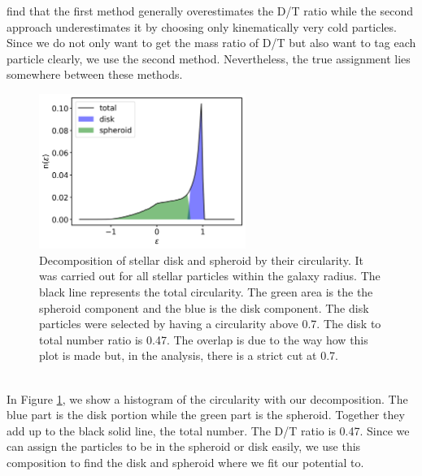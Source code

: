 \cite{AurigaGrand} find that the first method generally overestimates the \ac{D/T} ratio while the second approach underestimates it by choosing only kinematically very cold particles. Since we do not only want to get the mass ratio of \ac{D/T} but also want to tag each particle clearly, we use the second method. Nevertheless, the true assignment lies somewhere between these methods. 
\begin{figure}%
\captionsetup{format=plain}
    \centering
    \includegraphics[width=0.6\textwidth]{plots/Auriga/decomposition_snap_127.png}
\caption{Decomposition of stellar disk and spheroid by their circularity. It was carried out for all stellar particles within the galaxy radius. The black line represents the total circularity. The green area is the the spheroid component and the blue is the disk component. The disk particles were selected by having a circularity above 0.7. The disk to total number ratio is 0.47. The overlap is due to the way how this plot is made but, in the analysis, there is a strict cut at 0.7.}\label{fig:decomposition}
\end{figure}
\\In Figure \ref{fig:decomposition}, we show a histogram of the circularity with our decomposition. The blue part is the disk portion while the green part is the spheroid. Together they add up to the black solid line, the total number. The \ac{D/T} ratio is 0.47.
Since we can assign the particles to be in the spheroid or disk easily, we use this composition to find the disk and spheroid where we fit our potential to.
\iffalse
